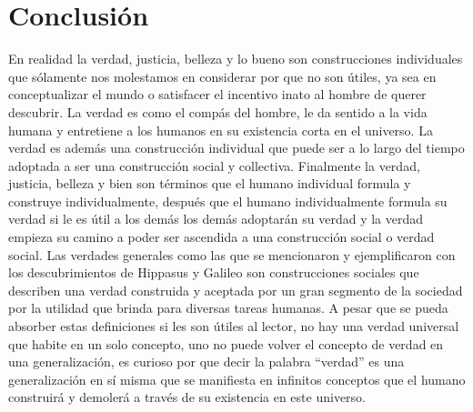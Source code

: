 \documentclass{article}
\begin{document}
\section{Conclusión}
En realidad la verdad, justicia, belleza y lo bueno son construcciones individuales que sólamente nos molestamos en considerar por que no son útiles, ya sea en conceptualizar el mundo o satisfacer el incentivo inato al hombre de querer descubrir. La verdad es como el compás del hombre, le da sentido a la vida humana y entretiene a los humanos en su existencia corta en el universo. La verdad es además una construcción individual que puede ser a lo largo del tiempo adoptada a ser una construcción social y collectiva. Finalmente la verdad, justicia, belleza y bien son términos que el humano individual formula y construye individualmente, después que el humano individualmente formula su verdad si le es útil a los demás los demás adoptarán su verdad y la verdad empieza su camino a poder ser ascendida a una construcción social o verdad social. Las verdades generales como las que se mencionaron y ejemplificaron con los descubrimientos de Hippasus y Galileo son construcciones sociales que describen una verdad construida y aceptada por un gran segmento de la sociedad por la utilidad que brinda para diversas tareas humanas. A pesar que se pueda absorber estas definiciones si les son útiles al lector, no hay una verdad universal que habite en un solo concepto, uno no puede volver el concepto de verdad en una generalización, es curioso por que decir la palabra ``verdad'' es una generalización en sí misma que se manifiesta en infinitos conceptos que el humano construirá y demolerá a través de su existencia en este universo.




\end{document}
